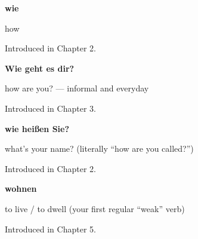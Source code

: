 \noindent\begin{minipage}[t]{\linewidth}
\raggedright
\textbf{wie}\par
\small how\par
\footnotesize Introduced in Chapter 2.
\end{minipage}\par\medskip

\noindent\begin{minipage}[t]{\linewidth}
\raggedright
\textbf{Wie geht es dir?}\par
\small how are you? — informal and everyday\par
\footnotesize Introduced in Chapter 3.
\end{minipage}\par\medskip

\noindent\begin{minipage}[t]{\linewidth}
\raggedright
\textbf{wie heißen Sie?}\par
\small what's your name? (literally \textquotedblleft{}how are you called?\textquotedblright{})\par
\footnotesize Introduced in Chapter 2.
\end{minipage}\par\medskip

\noindent\begin{minipage}[t]{\linewidth}
\raggedright
\textbf{wohnen}\par
\small to live / to dwell (your first regular \textquotedblleft{}weak\textquotedblright{} verb)\par
\footnotesize Introduced in Chapter 5.
\end{minipage}\par\medskip
